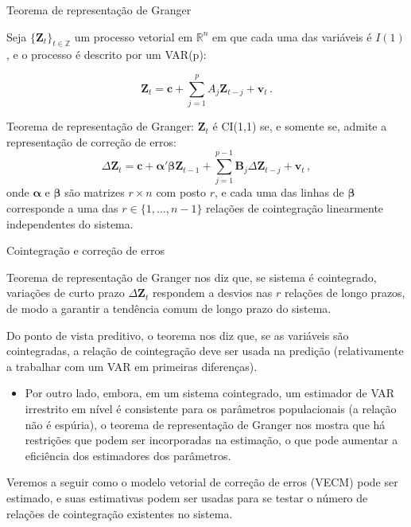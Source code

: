 \documentclass[11pt]{beamer}
\newenvironment{wideitemize}{\itemize\addtolength{\itemsep}{10pt}}{\enditemize}
\begin{document}
\begin{frame}{Teorema de representação de Granger}
	\begin{wideitemize}
		\item Seja $\{\boldsymbol{Z}_t\}_{t\in \mathbb{Z}}$ um processo vetorial em $\mathbb{R}^n$ em que cada uma das variáveis é $I(1)$, e o processo é descrito por um VAR(p):
		
		\begin{equation}
			\boldsymbol{Z}_t = \boldsymbol{c} + \sum_{j=1}^p A_j \boldsymbol{Z}_{t-j} + \boldsymbol{v}_t \, . 
		\end{equation}
		\item {\color{blue}Teorema de representação de Granger:} $\boldsymbol{Z}_t$ é CI(1,1) se, e somente se, admite a {\color{blue}representação de correção de erros}:
		\begin{equation}
			\label{coint_system}
			\Delta \boldsymbol{Z}_t  =  \boldsymbol{c} + \boldsymbol{\alpha}'\boldsymbol{\beta} \boldsymbol{Z}_{t-1} + \sum_{j=1}^{p-1} \boldsymbol{B}_{j} \Delta  \boldsymbol{Z}_{t-j} + \boldsymbol{v}_t \, , 
		\end{equation}
		onde $\boldsymbol{\alpha}$ e $ \boldsymbol{\beta}$ são matrizes $r \times n$ com posto $r$, e cada uma das linhas de $\boldsymbol{\beta}$ corresponde a uma das $r \in \{1,\ldots, n-1\}$ relações de cointegração linearmente independentes do sistema.

	\end{wideitemize}
\end{frame}

\begin{frame}{Cointegração e correção de erros}
\begin{wideitemize}
	 		\item Teorema de representação de Granger nos diz que, se sistema é cointegrado, variações de curto prazo $\Delta \boldsymbol{Z}_t$ respondem a desvios nas $r$ relações de longo prazos, de modo a garantir a tendência comum de longo prazo do sistema.
	 		\item Do ponto de vista preditivo, o teorema nos diz que, se as variáveis são cointegradas, a relação de cointegração deve ser usada na predição (relativamente a trabalhar com um VAR em primeiras diferenças).
	 		\begin{itemize}
	 			\item Por outro lado, embora, em um sistema cointegrado, um estimador de VAR irrestrito em nível é consistente para os parâmetros populacionais (a relação não é espúria), o teorema de representação de Granger nos mostra que há restrições que podem ser incorporadas na estimação, o que pode aumentar a eficiência dos estimadores dos parâmetros.
	 		\end{itemize}
	 		\item Veremos a seguir como o modelo vetorial de correção de erros (VECM) pode ser estimado, e suas estimativas podem ser usadas para se testar o número de relações de cointegração existentes no sistema.
	 	\end{wideitemize}
\end{frame}
\end{document}
